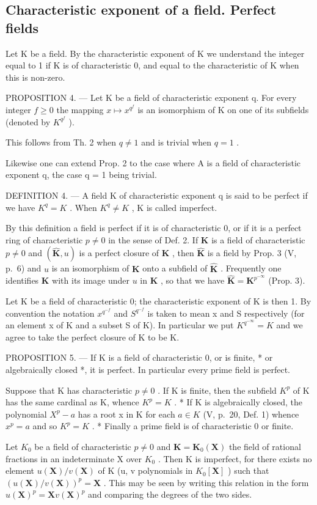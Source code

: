 \subsection{Characteristic exponent of a field. Perfect fields}

Let K be a field. By the characteristic exponent of K we understand the integer equal to 1 if K is of characteristic 0, and equal to the characteristic of K when this is non-zero.

PROPOSITION 4. --- Let K be a field of characteristic exponent q. For every integer \(f \geqslant 0\) the mapping \(x \mapsto x^{q^{f}}\) is an isomorphism of K on one of its subfields (denoted by \(K^{q^{f}}\) ).

This follows from Th. 2 when \(q \neq 1\) and is trivial when \(q = 1\) .

Likewise one can extend Prop. 2 to the case where A is a field of characteristic exponent q, the case q = 1 being trivial.

DEFINITION 4. --- A field K of characteristic exponent q is said to be perfect if we have \(K^{q} = K\) . When \(K^{q} \neq K\) , K is called imperfect.

By this definition a field is perfect if it is of characteristic 0, or if it is a perfect ring of characteristic \(p \neq 0\) in the sense of Def. 2. If \(\mathbf{K}\) is a field of characteristic \(p \neq 0\) and \((\hat{\mathbf{K}}, u)\) is a perfect closure of \(\mathbf{K}\) , then \(\hat{\mathbf{K}}\) is a field by Prop. 3 (V, p.~6) and \(u\) is an isomorphism of \(\mathbf{K}\) onto a subfield of \(\hat{\mathbf{K}}\) . Frequently one identifies \(\mathbf{K}\) with its image under \(u\) in \(\hat{\mathbf{K}}\) , so that we have \(\hat{\mathbf{K}} = \mathbf{K}^{p^{-\infty}}\) (Prop. 3).

Let K be a field of characteristic 0; the characteristic exponent of K is then 1. By convention the notation \(x^{q^{-f}}\) and \(S^{q^{-f}}\) is taken to mean x and S respectively (for an element x of K and a subset S of K). In particular we put \(K^{q^{-\infty}} = K\) and we agree to take the perfect closure of K to be K.

PROPOSITION 5. --- If K is a field of characteristic 0, or is finite, * or algebraically closed *, it is perfect. In particular every prime field is perfect.

Suppose that K has characteristic \(p \neq 0\) . If K is finite, then the subfield \(K^{p}\) of K has the same cardinal as K, whence \(K^{p} = K\) . * If K is algebraically closed, the polynomial \(X^{p} - a\) has a root x in K for each \(a \in K\) (V, p.~20, Def. 1) whence \(x^{p} = a\) and so \(K^{p} = K\) . * Finally a prime field is of characteristic 0 or finite.

Let \(K_{0}\) be a field of characteristic \(p \neq 0\) and \(\mathbf{K} = \mathbf{K}_{0}(\mathbf{X})\) the field of rational fractions in an indeterminate X over \(K_{0}\) . Then K is imperfect, for there exists no element \(u(\mathbf{X})/v(\mathbf{X})\) of K (u, v polynomials in \(K_{0}[\mathbf{X}]\) ) such that \((u(\mathbf{X})/v(\mathbf{X}))^{p} = \mathbf{X}\) . This may be seen by writing this relation in the form \(u(\mathbf{X})^{p} = \mathbf{X}v(\mathbf{X})^{p}\) and comparing the degrees of the two sides.

